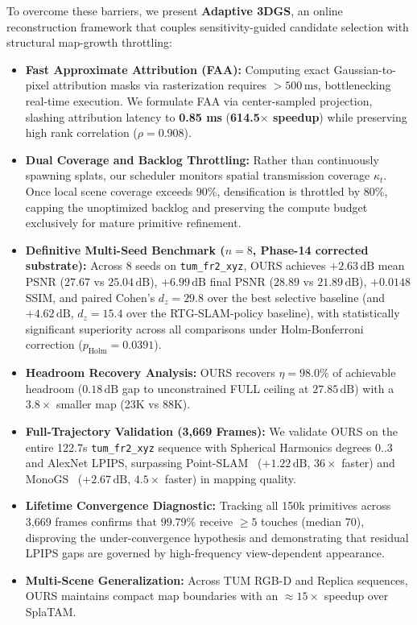 \documentclass[10pt,twocolumn,letterpaper]{article}
\begin{document}
To overcome these barriers, we present \textbf{Adaptive 3DGS}, an online reconstruction framework that couples sensitivity-guided candidate selection with structural map-growth throttling:
\begin{itemize}
\setlength{\itemsep}{1pt}
\item \textbf{Fast Approximate Attribution (FAA):} Computing exact Gaussian-to-pixel attribution masks via rasterization requires $>500\,\mathrm{ms}$, bottlenecking real-time execution. We formulate FAA via center-sampled projection, slashing attribution latency to \textbf{0.85 ms} (\textbf{614.5$\times$ speedup}) while preserving high rank correlation ($\rho = 0.908$).
\item \textbf{Dual Coverage and Backlog Throttling:} Rather than continuously spawning splats, our scheduler monitors spatial transmission coverage $\kappa_t$. Once local scene coverage exceeds $90\%$, densification is throttled by $80\%$, capping the unoptimized backlog and preserving the compute budget exclusively for mature primitive refinement.
\item \textbf{Definitive Multi-Seed Benchmark ($n=8$, Phase-14 corrected substrate):} Across 8 seeds on \texttt{tum\_fr2\_xyz}, OURS achieves $+2.63\,\mathrm{dB}$ mean PSNR ($27.67$ vs $25.04\,\mathrm{dB}$), $+6.99\,\mathrm{dB}$ final PSNR ($28.89$ vs $21.89\,\mathrm{dB}$), $+0.0148$ SSIM, and paired Cohen's $d_z = 29.8$ over the best selective baseline (and $+4.62\,\mathrm{dB}$, $d_z = 15.4$ over the RTG-SLAM-policy baseline), with statistically significant superiority across all comparisons under Holm-Bonferroni correction ($p_{\mathrm{Holm}} = 0.0391$).
\item \textbf{Headroom Recovery Analysis:} OURS recovers $\eta = \mathbf{98.0\%}$ of achievable headroom ($0.18\,\mathrm{dB}$ gap to unconstrained FULL ceiling at $27.85\,\mathrm{dB}$) with a $3.8\times$ smaller map (23K vs 88K).
\item \textbf{Full-Trajectory Validation (3,669 Frames):} We validate OURS on the entire 122.7s \texttt{tum\_fr2\_xyz} sequence with Spherical Harmonics degrees $0..3$ and AlexNet LPIPS, surpassing Point-SLAM~\cite{sandstrom2023pointslam} ($+1.22\,\mathrm{dB}$, $36\times$ faster) and MonoGS~\cite{matsuki2024gaussian} ($+2.67\,\mathrm{dB}$, $4.5\times$ faster) in mapping quality.
\item \textbf{Lifetime Convergence Diagnostic:} Tracking all 150k primitives across 3,669 frames confirms that $99.79\%$ receive $\ge 5$ touches (median 70), disproving the under-convergence hypothesis and demonstrating that residual LPIPS gaps are governed by high-frequency view-dependent appearance.
\item \textbf{Multi-Scene Generalization:} Across TUM RGB-D and Replica sequences, OURS maintains compact map boundaries with an $\approx 15\times$ speedup over SplaTAM.
\end{itemize}
\end{document}
